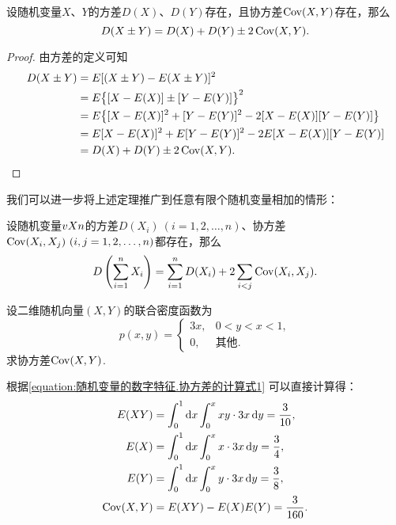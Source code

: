 \begin{theorem}
设随机变量\(X\)、\(Y\)的方差\(D(X)\)、\(D(Y)\)存在，且协方差\(\operatorname{Cov}(X,Y)\)存在，那么\begin{equation}
D(X \pm Y) = D(X) + D(Y) \pm 2 \operatorname{Cov}(X,Y).
\end{equation}
\begin{proof}
由方差的定义可知\begin{align*}
D(X \pm Y)
&= E[(X \pm Y) - E(X \pm Y)]^2 \\
&= E\bigl\{[X - E(X)] \pm [Y - E(Y)]\bigr\}^2 \\
&= E\bigl\{
[X - E(X)]^2 + [Y - E(Y)]^2 - 2 [X - E(X)][Y - E(Y)]
\bigr\} \\
&= E[X - E(X)]^2 + E[Y - E(Y)]^2 - 2 E[X - E(X)][Y - E(Y)] \\
&= D(X) + D(Y) \pm 2 \operatorname{Cov}(X,Y).
\qedhere
\end{align*}
\end{proof}
\end{theorem}

我们可以进一步将上述定理推广到任意有限个随机变量相加的情形：
\begin{corollary}
设随机变量\(v{X}{n}\)的方差\(D(X_i)\ (i=1,2,\dotsc,n)\)、协方差\(\Cov(X_i,X_j)\ (i,j=1,2,\dotsc,n)\)都存在，那么\begin{equation}
D\left( \sum\limits_{i=1}^n X_i \right)
= \sum\limits_{i=1}^n D(X_i)
+ 2 \sum\limits_{i<j} \operatorname{Cov}(X_i,X_j).
\end{equation}
\end{corollary}

\begin{example}
设二维随机向量\((X,Y)\)的联合密度函数为\[
p(x,y) = \left\{ \begin{array}{cl}
3x, & 0<y<x<1, \\
0, & \text{其他}.
\end{array} \right.
\]
求协方差\(\operatorname{Cov}(X,Y)\).
\begin{solution}
根据\cref{equation:随机变量的数字特征.协方差的计算式1} 可以直接计算得：
\begin{align*}
E(XY)
&= \int_0^1 \dd{x} \int_0^x xy \cdot 3x \dd{y}
= \frac{3}{10}, \\
E(X)
&= \int_0^1 \dd{x} \int_0^x x \cdot 3x \dd{y}
= \frac{3}{4}, \\
E(Y)
&= \int_0^1 \dd{x} \int_0^x y \cdot 3x \dd{y}
= \frac{3}{8}, \\
\operatorname{Cov}(X,Y)
&= E(XY) - E(X) E(Y)
= \frac{3}{160}.
\end{align*}
\end{solution}
\end{example}


